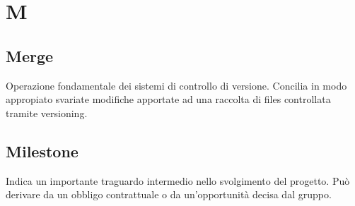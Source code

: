 \section*{M}

\subsection{Merge} 
Operazione fondamentale dei sistemi di controllo di versione. Concilia in modo appropiato svariate modifiche apportate ad una raccolta di files controllata tramite versioning.

\subsection{Milestone} 
Indica un importante traguardo intermedio nello svolgimento del progetto. Può derivare da un obbligo contrattuale o da un'opportunità decisa dal gruppo.
